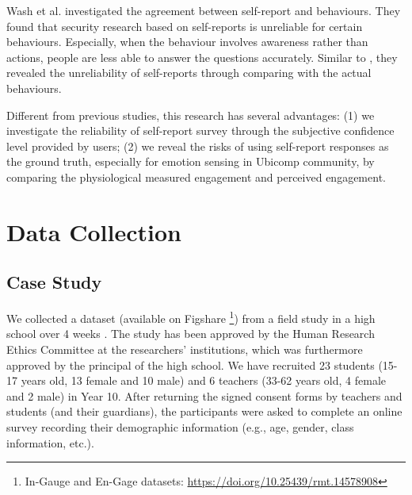 \documentclass[sigconf]{acmart}
\begin{document}
Wash et al. \cite{wash2017can} investigated the agreement between self-report and behaviours. They found that security research based on self-reports is unreliable for certain behaviours. Especially, when the behaviour involves awareness rather than actions, people are less able to answer the questions accurately. Similar to \cite{moller2013investigating}, they revealed the unreliability of self-reports through comparing with the actual behaviours.  

Different from previous studies, this research has several advantages: (1) we investigate the reliability of self-report survey through the subjective confidence level provided by users; (2) we reveal the risks of using self-report responses as the ground truth, especially for emotion sensing in Ubicomp community, by comparing the physiological measured engagement and perceived engagement.   



\begin{comment}
\section{Research Questions}
\begin{itemize}
    \item RQ1: Is there correlation between quality of responses and survey completion time?
    \item RQ2: Can we infer the quality of self-report responses using EDA data?
    \item RQ3: Can we improve the prediction performance by selecting reliable self-report responses?
\end{itemize}
\end{comment}
\section{Data Collection}
\label{sec:Data collection}
\subsection{Case Study}
We collected a dataset \cite{gao2021ingauge,gao2021understanding} (available on Figshare \footnote{In-Gauge and En-Gage datasets: \href{https://doi.org/10.25439/rmt.14578908}{https://doi.org/10.25439/rmt.14578908}}) from a field study in a high school over 4 weeks  . The study has been approved by the Human Research Ethics Committee at the researchers' institutions, which was furthermore approved by the principal of the high school. We have recruited 23 students (15-17 years old, 13 female and 10 male) and 6 teachers (33-62 years old, 4 female and 2 male) in Year 10. After returning the signed consent forms by teachers and students (and their guardians), the participants were asked to complete an online survey recording their demographic information (e.g., age,  gender, class information, etc.). 
\end{document}
